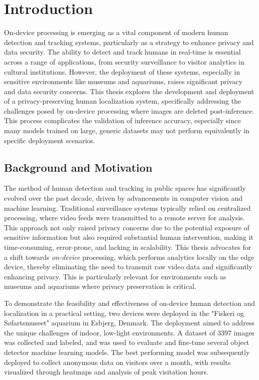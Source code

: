 \section{Introduction}
\label{sec:introduction}
On-device processing is emerging as a vital component of modern human detection and tracking systems, particularly as a strategy to enhance privacy and data security. The ability to detect and track humans in real-time is essential across a range of applications, from security surveillance to visitor analytics in cultural institutions. However, the deployment of these systems, especially in sensitive environments like museums and aquariums, raises significant privacy and data security concerns. This thesis explores the development and deployment of a privacy-preserving human localization system, specifically addressing the challenges posed by on-device processing where images are deleted post-inference. This process complicates the validation of inference accuracy, especially since many models trained on large, generic datasets may not perform equivalently in specific deployment scenarios.

\subsection{Background and Motivation}
The method of human detection and tracking in public spaces has significantly evolved over the past decade, driven by advancements in computer vision and machine learning. Traditional surveillance systems typically relied on centralized processing, where video feeds were transmitted to a remote server for analysis. This approach not only raised privacy concerns due to the potential exposure of sensitive information but also required substantial human intervention, making it time-consuming, error-prone, and lacking in scalability. This thesis advocates for a shift towards \textit{on-device} processing, which performs analytics locally on the edge device, thereby eliminating the need to transmit raw video data and significantly enhancing privacy. This is particularly relevant for environments such as museums and aquariums where privacy preservation is critical.

To demonstrate the feasibility and effectiveness of on-device human detection and localization in a practical setting, two devices were deployed in the "Fiskeri og Søfartsmuseet" aquarium in Esbjerg, Denmark. The deployment aimed to address the unique challenges of indoor, low-light environments. A dataset of 3397 images was collected and labeled, and was used to evaluate and fine-tune several object detector machine learning models. The best performing model was subsequently deployed to collect anonymous data on visitors over a month, with results visualized through heatmaps and analysis of peak visitation hours.

